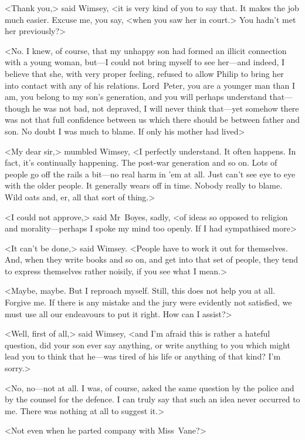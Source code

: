 <Thank you,> said Wimsey, <it is very kind of you to say that. It makes the job much easier. Excuse me, you say, <when you saw her in court.> You hadn't met her previously?>

<No. I knew, of course, that my unhappy son had formed an illicit connection with a young woman, but—I could not bring myself to see her—and indeed, I believe that she, with very proper feeling, refused to allow Philip to bring her into contact with any of his relations. Lord~Peter, you are a younger man than I am, you belong to my son's generation, and you will perhaps understand that—though he was not bad, not depraved, I will never think that—yet somehow there was not that full confidence between us which there should be between father and son. No doubt I was much to blame. If only his mother had lived\longdash>

<My dear sir,> mumbled Wimsey, <I perfectly understand. It often happens. In fact, it's continually happening. The post-war generation and so on. Lots of people go off the rails a bit—no real harm in 'em at all. Just can't see eye to eye with the older people. It generally wears off in time. Nobody really to blame. Wild oats and, er, all that sort of thing.>

<I could not approve,> said Mr~Boyes, sadly, <of ideas so opposed to religion and morality—perhaps I spoke my mind too openly. If I had sympathised more\longdash>

<It can't be done,> said Wimsey. <People have to work it out for themselves. And, when they write books and so on, and get into that set of people, they tend to express themselves rather noisily, if you see what I mean.>

<Maybe, maybe. But I reproach myself. Still, this does not help you at all. Forgive me. If there is any mistake and the jury were evidently not satisfied, we must use all our endeavours to put it right. How can I assist?>

<Well, first of all,> said Wimsey, <and I'm afraid this is rather a hateful question, did your son ever say anything, or write anything to you which might lead you to think that he—was tired of his life or anything of that kind? I'm sorry.>

<No, no—not at all. I was, of course, asked the same question by the police and by the counsel for the defence. I can truly say that such an idea never occurred to me. There was nothing at all to suggest it.>

<Not even when he parted company with Miss~Vane?>

